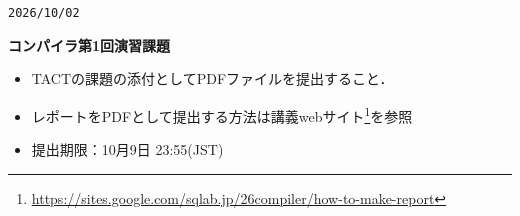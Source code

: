 \documentclass[dvipdfmx]{jarticle}
\begin{document}
\begin{flushright}
    \verb|2026/10/02|
\end{flushright}
\begin{center}
    {\bf\Large コンパイラ第1回演習課題}
\end{center}

\vspace*{5mm}

\begin{itemize}
    \item TACTの課題の添付としてPDFファイルを提出すること．
    \item レポートをPDFとして提出する方法は講義webサイト\footnote{\url{https://sites.google.com/sqlab.jp/26compiler/how-to-make-report}}を参照
    \item 提出期限：10月9日 23:55(JST)
\end{itemize}

\vspace*{5mm}
\end{document}
